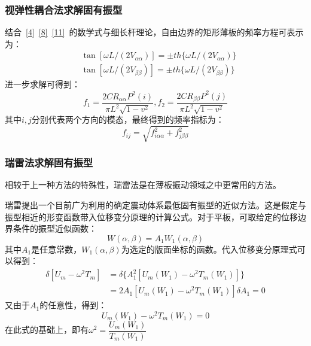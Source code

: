 \documentclass[withoutpreface,bwprint]{cumcmthesis} %
\begin{document}
\subsubsection{视弹性耦合法求解固有振型}
结合~\eqref{4}~\eqref{8}~\eqref{11}~的数学式与细长杆理论，自由边界的矩形薄板的频率方程可表示为：
\begin{equation}
    \begin{aligned}
        &\tan [\omega L /(2V_{\alpha\alpha})]=\pm th \{\omega L/(2V_{\alpha\alpha})\}\\
        &\tan [\omega L /(2V_{\beta\beta})]=\pm th \{\omega L/(2V_{\beta\beta})\}
    \end{aligned}
\end{equation}
进一步求解可得到：
\begin{equation}
    f_1=\frac{2CR_{\alpha\alpha} P^2(i)}{\pi L^2\sqrt{1-v^2}},f_2=\frac{2CR_{\beta\beta} P^2(j)}{\pi L^2\sqrt{1-v^2}}
\end{equation}
其中$i,j$分别代表两个方向的模态，最终得到的频率指标为：
\begin{equation}
    f_{ij}=\sqrt{f_{i\alpha\alpha}^2+f_{j\beta\beta}^2}
\end{equation}
\subsubsection{瑞雷法求解固有振型}
相较于上一种方法的特殊性，瑞雷法是在薄板振动领域之中更常用的方法。

瑞雷提出一个目前广为利用的确定震动体系最低固有振型的近似方法。这是假定与振型相近的形变函数带入位移变分原理的计算公式。对于平板，可取给定的位移边界条件的振型近似函数：
\begin{equation}
    W(\alpha,\beta)=A_1W_1(\alpha,\beta)
\end{equation}
其中$A_1$是任意常数，$W_1(\alpha,\beta)$为选定的版面坐标的函数。代入位移变分原理式可以得到：
\begin{equation}
\begin{aligned}
        \delta [U_m-\omega^2 T_m]&=\delta\{A_1^2[U_m(W_1)-\omega^2T_m(W_1)]\}\\
        &=2A_1[U_m(W_1)-\omega^2 T_m(W_1)]\delta A_1=0
\end{aligned}
\end{equation}
又由于$A_1$的任意性，得到：
\begin{equation}
    U_m(W_1)-\omega^2T_m(W_1)=0
\end{equation}
在此式的基础上，即有$\omega^2=\dfrac{U_m(W_1)}{T_m(W_1)}$
\end{document}
